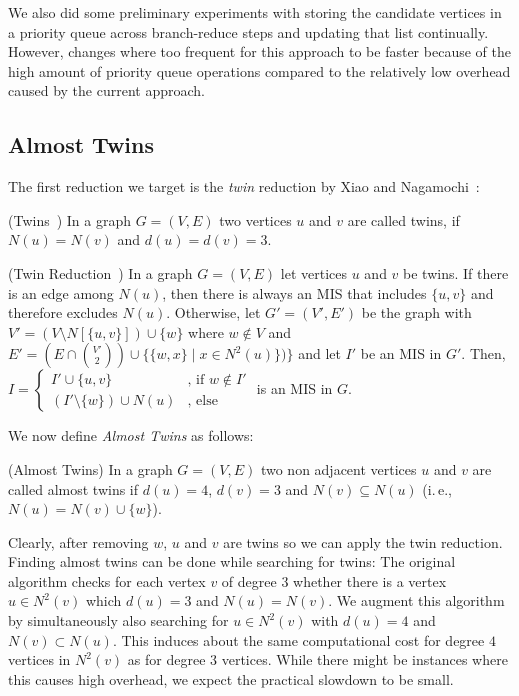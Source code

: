 \documentclass[a4paper,UKenglish,cleveref, autoref, thm-restate]{lipics-v2021}
\newcommand{\ie}{i.\,e.,\xspace}
\begin{document}
We also did some preliminary experiments with storing the candidate vertices in
a priority queue across branch-reduce steps and updating that list continually.
However, changes where too frequent for this approach to be faster because of
the high amount of priority queue operations compared to the relatively low overhead
caused by the current approach.

\subsection{Almost Twins}

The first reduction we target is the \emph{twin} reduction by Xiao and Nagamochi~\cite{XiaoUnconfined}:

\begin{definition}(Twins~\cite{XiaoUnconfined})
  In a graph $G=(V,E)$ two vertices $u$ and $v$ are called twins, if $N(u) = N(v)$ and $d(u) = d(v) = 3$.
\end{definition}

\begin{theorem} (Twin Reduction~\cite{XiaoUnconfined}) In a graph $G=(V,E)$ let
  vertices $u$ and $v$ be twins. If there is an edge among $N(u)$, then there is
  always an MIS that includes $\{u,v\}$ and therefore
  excludes $N(u)$. Otherwise, let $G'=(V',E')$ be the graph with $V'=(V\setminus
  N[\{u,v\}])\cup\{w\}$ where $w\notin V$ and $E'=(E\cap\binom{V'}{2})\cup
  \{\{w,x\}\;|\;x\in N^2(u)\})\}$ and let $I'$ be an MIS in $G'$. Then, 
  $
  I=\begin{cases}
    I'\cup \{u,v\} & \text{, if }w\notin I'\\
    (I'\setminus \{w\})\cup N(u) & \text{, else} %
  \end{cases}
  $
  is an MIS in $G$.
\end{theorem}

We now define \emph{Almost Twins} as follows:
\begin{definition} (Almost Twins)
  In a graph $G=(V,E)$ two non adjacent vertices $u$ and $v$ are called almost twins if $d(u) = 4$, $d(v) = 3$ and $N(v)\subseteq N(u)$ (\ie $N(u) = N(v) \cup \{w\}$). 
\end{definition}

Clearly, after removing $w$, $u$ and $v$ are twins so we can apply the twin
reduction. Finding almost twins can be done while searching for twins: The
original algorithm checks for each vertex $v$ of degree $3$ whether there is a
vertex $u \in N^2(v)$ which $d(u) = 3$ and $N(u) = N(v)$. We augment this
algorithm by simultaneously also searching for $u \in N^2(v)$ with $d(u) = 4$
and $N(v) \subset N(u)$. This induces about the same computational cost for
degree $4$ vertices in $N^2(v)$ as for degree $3$ vertices. While there might be
instances where this causes high overhead, we expect the practical slowdown to
be small.
\end{document}
